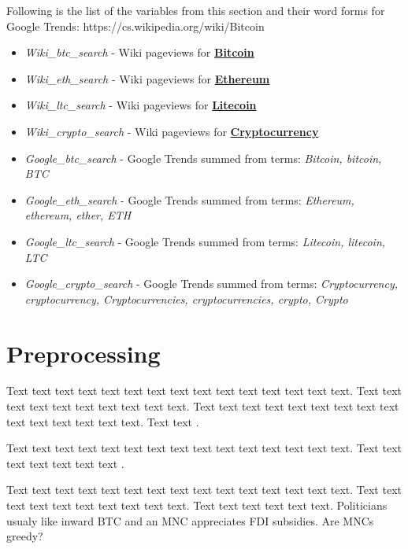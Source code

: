 Following is the list of the variables from this section and their word forms
for Google Trends:
https://cs.wikipedia.org/wiki/Bitcoin
\begin{itemize}
    \item \textit{Wiki\_btc\_search} - Wiki pageviews for \textbf{\href{https://cs.wikipedia.org/wiki/Bitcoin}{Bitcoin}}
    \item \textit{Wiki\_eth\_search} - Wiki pageviews for \textbf{\href{https://cs.wikipedia.org/wiki/Ethereum}{Ethereum}}
    \item \textit{Wiki\_ltc\_search} - Wiki pageviews for \textbf{\href{https://cs.wikipedia.org/wiki/Litecoin}{Litecoin}}
    \item \textit{Wiki\_crypto\_search} - Wiki pageviews for \textbf{\href{https://en.wikipedia.org/wiki/Cryptocurrency}{Cryptocurrency}}
    \item \textit{Google\_btc\_search} - Google Trends summed from terms: \textit{Bitcoin, bitcoin, BTC}
    \item \textit{Google\_eth\_search} - Google Trends summed from terms: \textit{Ethereum, ethereum, ether, ETH}
    \item \textit{Google\_ltc\_search} - Google Trends summed from terms: \textit{Litecoin, litecoin, LTC}
    \item \textit{Google\_crypto\_search} - Google Trends summed from terms: \textit{Cryptocurrency, cryptocurrency, Cryptocurrencies, cryptocurrencies, crypto, Crypto}
\end{itemize}


\section{Preprocessing}






Text text text text text text text text text text text text text text text. Text text text text text text text text text text. Text text text text text text text text text text text text text text text. Text text  \citet{Haufler2006}.

Text text text text text text text text text text text text text text text. Text text text text text text text \cite[see, ,][pg.~10]{Haaparanta1996}. 



Text text text text text text text text text text text text text text text. Text text text text text text text text text text. Text text text text text text. Politicians usualy like inward \ac{BTC} and an \ac{MNC} appreciates \ac{FDI} subsidies. Are \acp{MNC} greedy?



